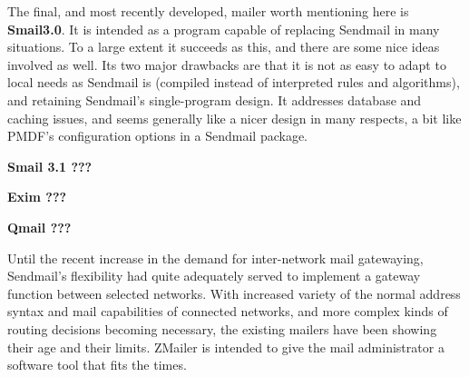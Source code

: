 The final, and most recently developed, mailer worth mentioning here is
{\bf Smail3.0}.
It is intended as a program capable of replacing Sendmail in many
situations. To a large extent it succeeds as this, and there are some nice
ideas involved as well. Its two major drawbacks are that it is not as easy
to adapt to local needs as Sendmail is (compiled instead of interpreted
rules and algorithms), and retaining Sendmail's single-program design.  It
addresses database and caching issues, and seems generally like a nicer
design in many respects, a bit like PMDF's configuration options in a
Sendmail package.

{\bf Smail 3.1 ???}

{\bf Exim ???}

{\bf Qmail ???}

Until the recent increase in the demand for inter-network mail gatewaying,
Sendmail's flexibility had quite adequately served to implement a gateway
function between selected networks.  With increased variety of the normal
address syntax and mail capabilities of connected networks, and more complex
kinds of routing decisions becoming necessary, the existing mailers have
been showing their age and their limits.  ZMailer is intended to give the
mail administrator a software tool that fits the times.
